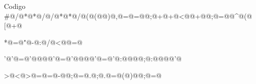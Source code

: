 \documentclass[12]{beamer}
\begin{document}
\begin{frame}{Codigo}
\verb@#@\verb@d@\verb@e@\verb@f@\verb@i@\verb@n@\verb@e@\verb@/@\verb@*@\verb@*@\verb@/@\verb@A@\verb@l@\verb@a@\verb@n@\verb@/@\verb@*@\verb@*@\verb@/@\verb@(@\verb@f@\verb@f@\verb@l@\verb@u@\verb@s@\verb@h@\verb@(@@\verb@)@\verb@,@\verb@j@\verb@=@\verb@c@\verb@=@@\verb@;@\verb@+@\verb@+@\verb@c@\verb@<@\verb@b@{}@\verb@+@@\verb@;@\verb@v@\verb@=@\verb@b@{}@\verb@^@\verb@(@\verb@b@\verb@[@\verb@c@\verb@+@ 

\verb@c@\verb@h@\verb@a@\verb@r@\verb@*@\verb@H@\verb@=@\verb@"@\verb@c@\verb@l@\verb@o@\verb@s@\verb@e@\verb@\@\verb@r@\verb@\@\verb@n@\verb@C@\verb@o@\verb@n@\verb@t@\verb@e@\verb@n@\verb@t@\verb@-@\verb@T@\verb@y@\verb@p@\verb@e@\verb@:@\verb@t@\verb@e@\verb@x@\verb@t@\verb@/@\verb@h@\verb@t@\verb@m@\verb@l@\verb@\@\verb@r@\verb@\@\verb@n@\verb@\@\verb@r@\verb@\@\verb@n@\verb@<@\verb@c@\verb@a@\verb@n@\verb@v@\verb@a@\verb@s@\verb@ @\verb@i@\verb@d@\verb@=@\verb@\@ 

\verb@'@\verb@c@\verb@'@\verb@w@\verb@i@\verb@d@\verb@t@\verb@h@\verb@=@\verb@'@@@@\verb@'@\verb@h@\verb@e@\verb@i@\verb@g@\verb@h@\verb@t@\verb@=@\verb@'@@@@\verb@'@\verb@s@\verb@t@\verb@y@\verb@l@\verb@e@\verb@=@\verb@'@\verb@w@\verb@i@\verb@d@\verb@t@\verb@h@\verb@:@@@@\verb@p@\verb@x@\verb@;@\verb@h@\verb@e@\verb@i@\verb@g@\verb@h@\verb@t@\verb@:@@@@\verb@p@\verb@x@\verb@'@\verb@\@ 

\verb@>@\verb@<@\verb@s@\verb@c@\verb@r@\verb@i@\verb@p@\verb@t@\verb@>@\verb@x@\verb@=@\verb@y@\verb@=@\verb@-@@\verb@;@\verb@v@\verb@=@\verb@w@\verb@i@\verb@n@\verb@d@\verb@o@\verb@w@\verb@.@\verb@c@\verb@;@\verb@v@\verb@.@\verb@o@\verb@n@\verb@m@\verb@o@\verb@u@\verb@s@\verb@e@\verb@m@\verb@o@\verb@v@\verb@e@\verb@=@\verb@f@\verb@u@\verb@n@\verb@c@\verb@t@\verb@i@\verb@o@\verb@n@\verb@(@\verb@e@\verb@)@@\verb@;@\verb@w@\verb@=@\verb@\@ 


\end{frame}
\end{document}
